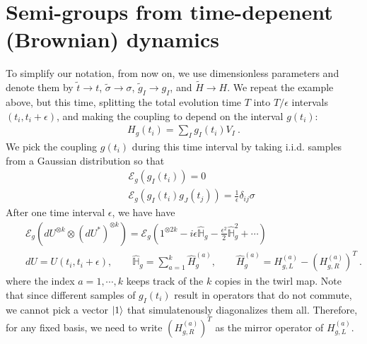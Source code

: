 \documentclass{article}
\theoremstyle{definition}
\newcommand{\nn}{\nonumber}
\newcommand{\lb}{\left(}
\newcommand{\rb}{\right)}
\newcommand{\ep}{\epsilon}
\begin{document}
    \section{Semi-groups from time-depenent (Brownian) dynamics}

    To simplify our notation, from now on, we use dimensionless parameters and denote
    them by $\tilde{t}\to t$, $\tilde{\sigma}\to \sigma$, $\tilde{g}_{I}\to g_{I}$,
    and $\tilde{H}\to H$. We repeat the example above, but this time, splitting the
    total evolution time $T$ into $T/\epsilon$ intervals $(t_{i},t_{i}+\epsilon)$,
    and making the coupling to depend on the interval $g(t_{i})$:
    \begin{eqnarray}
        H_g(t_i)=\sum_I g_I(t_i)V_I\ .
    \end{eqnarray}
    We pick the coupling $g(t_{i})$ during this time interval by taking i.i.d.
    samples from a Gaussian distribution so that
    \begin{eqnarray}
        &&\mathcal{E}_g(g_I(t_i))=0\nn\\
        &&\mathcal{E}_g(g_I(t_i)g_J(t_j))=\frac{1}{\ep}\delta_{ij}\sigma
    \end{eqnarray}
    After one time interval $\ep$, we have have
    \begin{eqnarray}
        &&\mathcal{E}_g(dU^{\otimes k}\otimes (dU^*)^{\otimes k})=\mathcal{E}_g\lb
        1^{\otimes 2k}-i\ep \hat{\mathbb{H}}_g-\frac{\ep^{2}}{2}\hat{\mathbb{H}}_g^2+\cdots\rb
        \nn\\
        &&dU=U(t_i,t_i+\ep),\qquad \hat{\mathbb{H}}_g=\sum_{a=1}^k \hat{H}_g^{(a)},\qquad\hat{H}_g^{(a)}=H_{g,L}^{(a)}-(H_{g,R}^{(a)})^T\nn\ .
    \end{eqnarray}
    where the index $a=1,\cdots , k$ keeps track of the $k$ copies in the twirl map.
    Note that since different samples of $g_{I}(t_{i})$ result in operators that
    do not commute, we cannot pick a vector $\ket{1}$ that simulatenously diagonalizes
    them all. Therefore, for any fixed basis, we need to write
    $(H_{g,R}^{(a)})^{T}$ as the mirror operator of $H_{g,L}^{(a)}$.
\end{document}
